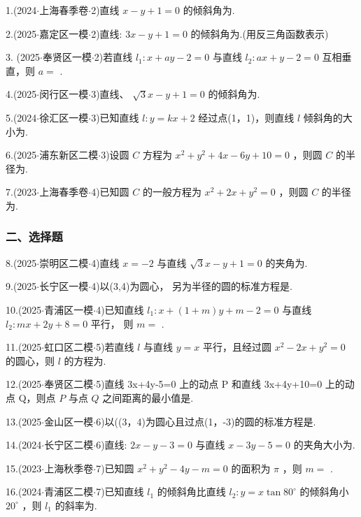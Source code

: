 1.(2024$\cdot$上海春季卷$\cdot$2)直线 $x - y + 1 = 0$ 的倾斜角为\blkda[2]{}.

2.(2025$\cdot$嘉定区一模$\cdot$2)直线: ${3x} - y + 1 = 0$ 的倾斜角为\blkda[2]{}.(用反三角函数表示)

3. (2025$\cdot$奉贤区一模$\cdot$2)若直线 ${l}_{1} : x + {ay} - 2 = 0$ 与直线 ${l}_{2} : {ax} + y - 2 = 0$ 互相垂直，则 $a =$ \blkda[2]{}.

4.(2025$\cdot$闵行区一模$\cdot$3)直线、 $\sqrt{3}x - y + 1 = 0$ 的倾斜角为\blkda[2]{}.

5.(2024$\cdot$徐汇区一模$\cdot$3)已知直线 $l : y = {kx} + 2$ 经过点(1，1)，则直线 $l$ 倾斜角的大小为\blkda[2]{}.

6.(2025$\cdot$浦东新区二模$\cdot$3)设圆 $C$ 方程为 ${x}^{2} + {y}^{2} + {4x} - {6y} + {10} = 0$ ，则圆 $C$ 的半径为\blkda[2]{}.

7.(2023$\cdot$上海春季卷$\cdot$4)已知圆 $C$ 的一般方程为 ${x}^{2} + {2x} + {y}^{2} = 0$ ，则圆 $C$ 的半径为\blkda[2]{}.

\subsubsection*{二、选择题}

8.(2025$\cdot$崇明区二模$\cdot$4)直线 $x =  - 2$ 与直线 $\sqrt{3}x - y + 1 = 0$ 的夹角为\blkda[2]{}.

9.(2025$\cdot$长宁区一模$\cdot$4)以(3,4)为圆心，  另为半径的圆的标准方程是\blkda[2]{}.

10.(2025$\cdot$青浦区一模$\cdot$4)已知直线 ${l}_{1} : x + \left( {1 + m}\right) y + m - 2 = 0$ 与直线 ${l}_{2} : {mx} + {2y} + 8 = 0$ 平行， 则 $m =$ \blkda[2]{}.

11.(2025$\cdot$虹口区二模$\cdot$5)若直线 $l$ 与直线 $y = x$ 平行，且经过圆 ${x}^{2} - {2x} + {y}^{2} = 0$ 的圆心，则 $l$ 的方程为\blkda[2]{}.

12.(2025$\cdot$奉贤区二模$\cdot$5)直线 3x+4y-5=0 上的动点 P 和直线 3x+4y+10=0 上的动点 Q，则点 $P$ 与点 $Q$ 之间距离的最小值是\blkda[2]{}.

13.(2025$\cdot$金山区一模$\cdot$6)以((3，4)为圆心且过点(1，-3)的圆的标准方程是\blkda[2]{}.

14.(2024$\cdot$长宁区二模$\cdot$6)直线: ${2x} - y - 3 = 0$ 与直线 $x - {3y} - 5 = 0$ 的夹角大小为\blkda[2]{}.

15.(2023$\cdot$上海秋季卷$\cdot$7)已知圆 ${x}^{2} + {y}^{2} - {4y} - m = 0$ 的面积为 $\pi$ ，则 $m =$ \blkda[2]{}.

16.(2024$\cdot$青浦区二模$\cdot$7)已知直线 ${l}_{1}$ 的倾斜角比直线 ${l}_{2} : y = x\tan {80}^{ \circ  }$ 的倾斜角小 ${20}^{ \circ  }$ ，则 ${l}_{1}$ 的斜率为\blkda[2]{}.

